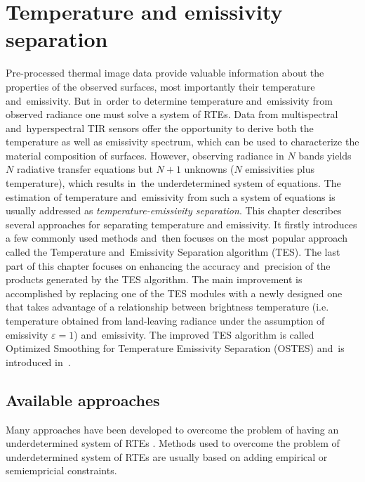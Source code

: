 \chapter{Temperature and emissivity separation}
\label{chap:TES}

Pre-processed thermal image data provide valuable information about the properties of the observed surfaces, most importantly their temperature and~emissivity. But in~order to determine temperature and~emissivity from observed radiance one must solve a system of RTEs. Data from multispectral and~hyperspectral TIR sensors offer the opportunity to derive both the temperature as well as emissivity spectrum, which can be used to characterize the material composition of surfaces. However, observing radiance in $N$ bands yields $N$ radiative transfer equations but $N+1$ unknowns ($N$ emissivities plus temperature), which results in~the underdetermined system of equations. The estimation of temperature and~emissivity from such a system of equations is usually addressed as \textit{temperature-emissivity separation}. This chapter describes several approaches for separating temperature and emissivity. It firstly introduces a few commonly used methods and~then focuses on the most popular approach called the Temperature and~Emissivity Separation algorithm (TES). The last part of this chapter focuses on enhancing the accuracy and~precision of the products generated by the TES algorithm. The main improvement is accomplished by replacing one of the TES modules with a newly designed one that takes advantage of a relationship between brightness temperature (i.e. temperature obtained from land-leaving radiance under the assumption of emissivity $\varepsilon = 1$) and~emissivity. The improved TES algorithm is called Optimized Smoothing for Temperature Emissivity Separation (OSTES) and~is introduced in~\cite{PK16}.

\section{Available approaches}
\label{sec:AvailApproach}

Many approaches have been developed to overcome the problem of having an underdetermined system of RTEs \cite{LT13}. Methods used to overcome the problem of underdetermined system of RTEs are usually based on adding empirical or semiempricial constraints. 

